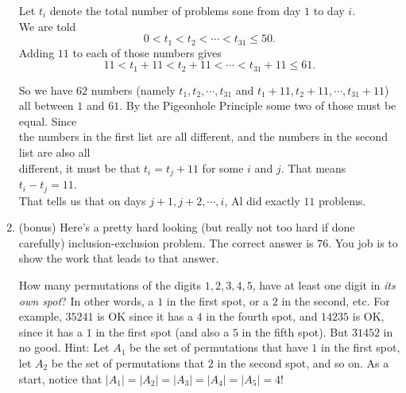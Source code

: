\documentclass[11pt]{amsart}
\begin{document}
\begin{enumerate}
{\color{blue}
Let $t_i$ denote the total number of problems sone  from day $1$ to day $i$.\\
We are told\\
\[
0<t_1<t_2<\cdots <t_{31} \leq 50.
\]
Adding $11$ to each of those numbers gives
\[
11<t_1+11<t_2+11<\cdots <t_{31}+11 \leq 61.
\]

So we have $62$ numbers (namely $t_1, t_2, \cdots, t_{31}$ and $t_1+11, t_2+11, \cdots ,t_{31}+11$)\\
 all between $1$ and $61$.  By the Pigeonhole Principle some two of those must be equal. Since\\ 
the numbers in the first list are all different, and the numbers in the second list are also all \\
different, it must be that $t_i = t_j + 11$ for some $i$ and $j$. That means $t_i - t_j = 11$. \\
That tells us that on days $j+1, j+2,\cdots , i$, Al did exactly $11$ problems.\\[5pt]
}

\item (bonus) Here's a pretty hard looking (but really not too hard if done carefully) inclusion{-}exclusion problem. The correct answer is $76$. You job is to show the work that leads to that answer.

How many permutations of the digits $1,2,3,4,5$, have at least one digit in {\it its
own spot}? In other words, a $1$ in the first spot, or a $2$ in the second, etc.
For example, $35241$ is OK since it has a $4$ in the fourth spot, and $14235$ is OK, since
it has a $1$ in the first spot (and also a $5$ in the fifth spot). But $31452$ in no good.
Hint: Let $A_1$ be the set of permutations that have $1$ in the first spot, let $A_2$ be
the set of permutations that $2$ in the second spot, and so on. As a start, notice that $|A_{1}|
= |A_{2}| = |A_{3}| = |A_{4}| = |A_{5}| = 4!$ \\[3pt]


\end{enumerate}
\end{document}
